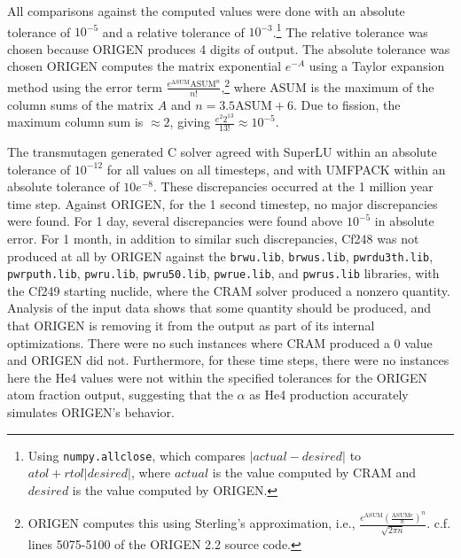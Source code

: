 All comparisons against the computed values were done with an absolute
tolerance of $10^{-5}$ and a relative tolerance of $10^{-3}$.\footnote{Using
  \texttt{numpy.\allowbreak{}allclose}, which compares $|actual -
  desired|$ to $atol + rtol|desired|$,
  where $actual$ is the value computed by CRAM and $desired$ is the
  value computed by ORIGEN.} The relative tolerance was chosen because ORIGEN
produces 4 digits of output. The absolute tolerance was chosen ORIGEN computes
the matrix exponential $e^{-A}$ using a Taylor expansion method using the error term
$\frac{e^{\mathrm{ASUM}}\mathrm{ASUM}^n}{n!}$,\footnote{ORIGEN computes this using
    Sterling's approximation, i.e.,
    $\frac{e^{\mathrm{ASUM}}(\frac{\mathrm{ASUM}e}{n})^n}{\sqrt{2\pi
      n}}$. c.f. lines 5075-5100 of the ORIGEN 2.2 source code.} where
$\mathrm{ASUM}$ is the maximum of the column sums of the matrix $A$ and $n =
3.5\mathrm{ASUM} + 6$. Due to fission, the maximum
column sum is $\approx 2$, giving $\frac{e^{2}2^{13}}{13!}\approx 10^{-5}$.

The transmutagen generated C solver agreed with SuperLU within an absolute
tolerance of $10^{-12}$ for all values on all timesteps, and with UMFPACK
within an absolute tolerance of $10e^{-8}$. These discrepancies occurred at
the 1 million year time step. Against ORIGEN, for the 1 second timestep, no
major discrepancies were found. For 1 day, several discrepancies were found
above $10^{-5}$ in absolute error. For 1 month, in addition to similar such
discrepancies, Cf248 was not produced at all by ORIGEN against the
\texttt{brwu.\allowbreak{}lib}, \texttt{brwus.\allowbreak{}lib},
\texttt{pwrdu3th.\allowbreak{}lib}, \texttt{pwrputh.\allowbreak{}lib},
\texttt{pwru.\allowbreak{}lib}, \texttt{pwru50.\allowbreak{}lib},
\texttt{pwrue.\allowbreak{}lib}, and \texttt{pwrus.\allowbreak{}lib}
libraries, with the Cf249 starting nuclide, where the CRAM solver produced a
nonzero quantity. Analysis of the input data shows that some quantity should
be produced, and that ORIGEN is removing it from the output as part of its
internal optimizations. There were no such instances where CRAM produced a 0
value and ORIGEN did not. Furthermore, for these time steps, there were no
instances here the He4 values were not within the specified tolerances for the
ORIGEN atom fraction output, suggesting that the $\alpha$ as He4 production
accurately simulates ORIGEN's behavior.
